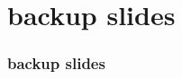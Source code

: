 \date{}
\title{}
\date{}



\section{backup slides}
\begin{frame}\frametitle{backup slides}
\end{frame}


